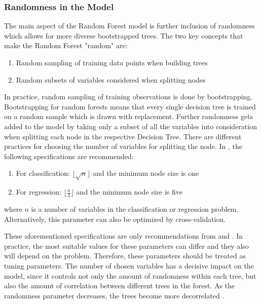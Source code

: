 \subsubsection{Randomness in the Model}
The main aspect of the Random Forest model is further inclusion of randomness which allows for more diverse bootstrapped trees.
The two key concepts that make the Random Forest "random" are:

\begin{enumerate}
	\item Random sampling of training data points when building trees
	\item Random subsets of variables considered when splitting nodes
\end{enumerate}

In practice, random sampling of training observations is done by bootstrapping. 
Bootstrapping for random forests means that every single decision tree is trained on a random sample 
which is drawn with replacement. 
Further randomness gets added to the model by taking only a subset of all the variables into consideration
when splitting each node in the respective Decision Tree.
There are different practices for choosing the number of variables for splitting the node.
In \cite{friedman2001elements}, the following specifications are recommended:

\begin{enumerate}
	\item For classification:  $\lfloor{\sqrt{n}} \rfloor$ and the minimum node size is one
	\item For regression: $\lfloor \frac{n}{3} \rfloor$ and the minimum node size is five
\end{enumerate}

where $n$ is a number of variables in the classification or regression problem.
Alternatively, this parameter can also be optimized by cross-validation.


These aforementioned specifications are
only recommendations from \cite{friedman2001elements} and \cite{breiman2001random}. 
In practice, the most suitable values for these parameters
can differ and they also will depend on the problem. Therefore, these parameters should be
treated as tuning parameters. The number of chosen variables has a decisive impact on the model,
since it controls not only the amount of randomness within each tree,
but also the amount of correlation between different trees in the forest.
As the randomness parameter decreases, the trees become more decorrelated \cite{criminisi2012decision}.

